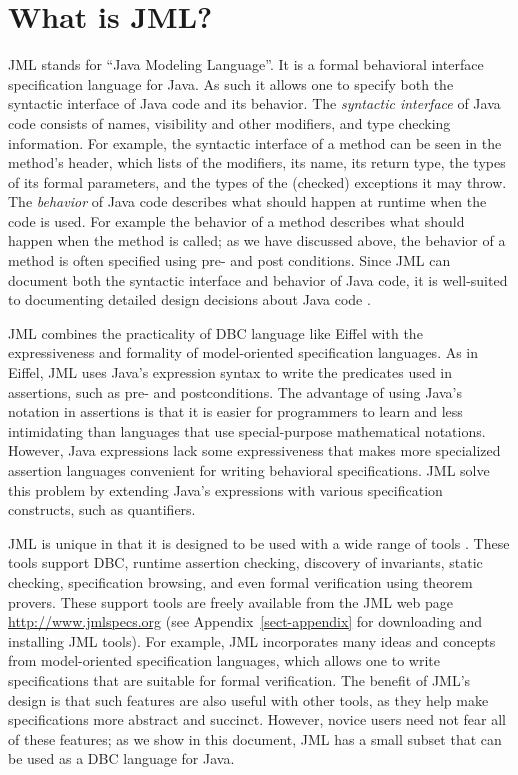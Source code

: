 \documentclass{jotarticle}
\begin{document}
\section{What is JML?}

JML stands for ``Java Modeling Language''.  It is a formal behavioral
interface specification language for Java.
As such it allows one to specify both the syntactic interface of
Java code and its behavior.  The \emph{syntactic interface\/} of Java code
consists of names, visibility and other modifiers,
and type checking information.
For example, the syntactic interface of a method can be seen in the
method's header, which lists of the modifiers, its name, its return
type, the types of its formal parameters, and the types of the
(checked) exceptions it may throw.
The \emph{behavior\/} of Java code describes what should happen at
runtime when the code is used.  For example the behavior of a method
describes what should happen when the method is called;
as we have discussed above, the behavior of a method is often
specified using pre- and post conditions.
Since JML can document both the syntactic interface and behavior of
Java code, it is well-suited to documenting detailed design decisions
about Java code \cite{Leavens-Baker-Ruby03}.

JML combines the practicality of DBC language like Eiffel
\cite{Meyer92b} with the expressiveness and formality of
model-oriented specification languages.  As in Eiffel, JML uses Java's
expression syntax to write the predicates used in assertions, such as
pre- and postconditions.
The advantage of using Java's notation in assertions
is that it is easier for programmers to learn and less
intimidating than languages that use special-purpose mathematical
notations. However, Java expressions lack some expressiveness
that makes more specialized assertion languages convenient for writing
behavioral specifications.
JML solve this problem by extending Java's expressions with various
specification constructs, such as quantifiers.

JML is unique in that it is designed to be used with a wide range of
tools \cite{Burdy-etal03,Leavens-etal03a}.
These tools support DBC, runtime assertion checking, discovery of
invariants, static checking, specification browsing, and even
formal verification using theorem provers.
These support tools are freely available from the JML web page
\url{http://www.jmlspecs.org} 
(see Appendix~\ref{sect-appendix} for downloading and installing JML
tools).
For example, JML incorporates many ideas and concepts from
model-oriented specification languages,
which allows one to write specifications that are suitable for formal
verification.  The benefit of JML's design is that such features are
also useful with other tools, as they help make specifications more
abstract and succinct.
However, novice users need not fear all of these features;
as we show in this document, JML has a small subset that can be used
as a DBC language for Java.  
\end{document}
